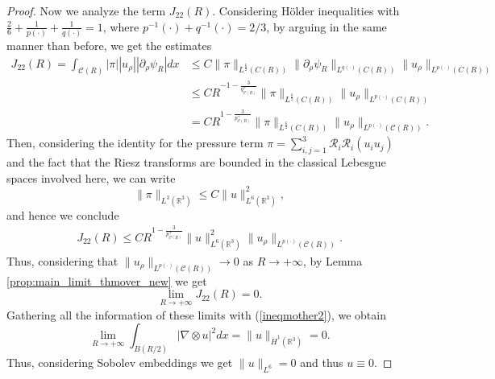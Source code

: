 \documentclass[a4paper,12pt]{amsart}
\theoremstyle{definition}
\theoremstyle{plain}
\def\R{\mathbb{R}}
\def\R{\mathbb R}
\def\vu{ u }
\def\vn{ \nabla }
\begin{document}
\begin{proof}
Now we analyze the term $J_{22}(R)$. Considering H\"older inequalities with $ \frac{2}{6}+\frac{1}{p (\cdot) } + \frac 1 {q(\cdot)} =1$, where $p^{-1}(\cdot)+q^{-1}(\cdot)=2/3$,  by arguing in the same manner than before, we  get the estimates 
\begin{align}
J_{22}(R)
= 
\int_{\mathcal{C}( R) } 
 |\pi |
 | \vu_\rho |
| \partial_\rho\psi_R |  
  dx 
&\leq 
C 
\|\pi \|_{L^{\frac{6}{2}}(C( R) )}
\|  \partial_\rho\psi_R \|_{L^{q (\cdot)  }(C( R) )} 
\| \vu_\rho \|_{L^{p(\cdot) }( C ( R) )} 
\\
&\leq 
 C  R^{-1-\frac 3{q_{\mathcal{C}( R)  }^+}}
\|\pi \|_{L^{\frac{6 }{2}}( C( R) )}\| \vu_\rho \|_{L^{p(\cdot)}( C( R) )}
\\
&=
 C R^{1-\frac 3{p_{\mathcal{C}( R)  }^+}}
\|\pi \|_{L^{\frac{6 }{2}}( C( R) )}\| \vu_\rho \|_{L^{p(\cdot)}(\mathcal{C}( R)  )}
.%
\end{align}
Then, considering the identity for the pressure term $\pi=\sum_{i,j=1}^3\mathcal{R}_i\mathcal{R}_i(u_iu_j)$  and the fact that the Riesz transforms are bounded in the classical Lebesgue spaces involved here, we can write 
  \begin{equation}
  \|\pi \|_{L^{ 3}( \R^3 )} \leq 
  C 
    \|u \|^2_{L^{ 6}( \R^3 )  } 
  ,
  \end{equation}
and hence  we conclude
  \begin{align}
J_{22}(R)\leq 
 C R^{1-\frac 3{p_{\mathcal{C}( R)  }^+}}
 \|\vu \|^2_{L^{6}( \R^3 )}
\| \vu_\rho \|_{L^{p(\cdot)}(\mathcal{C}( R)  )}
.
\end{align}
Thus, considering that 
$\|\vu_\rho\|_{L^{p(\cdot)}( \mathcal{C}( R)   )}\to 0$ as  $R\to +\infty$, by Lemma \ref{prop:main_limit_thmover_new} we get
 $$
\lim_{R\to +\infty} J_{22}(R) = 0.$$ 
Gathering all the information of these limits  with (\ref{ineqmother2}), we obtain
\begin{equation} 
\lim_{R\to +\infty}\int_{B(R/2)}|\vn \otimes \vu|^2 dx=\|\vu\|_{\dot{H}^1(\R^3)}=0.
\end{equation}
Thus, 
considering Sobolev embeddings we  get $\|\vu\|_{L^6}=0$ and thus  $\vu\equiv 0$. 
\end{proof}
\end{document}
